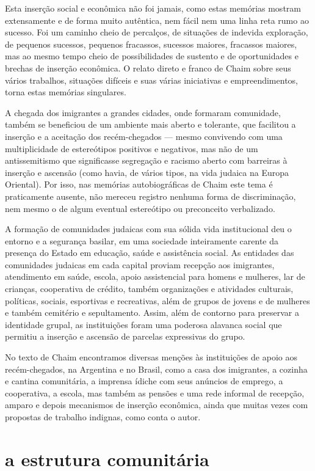 Esta inserção social e econômica não foi jamais, como estas memórias
mostram extensamente e de forma muito autêntica, nem fácil nem uma linha
reta rumo ao sucesso. Foi um caminho cheio de percalços, de situações de
indevida exploração, de pequenos sucessos, pequenos fracassos, sucessos
maiores, fracassos maiores, mas ao mesmo tempo cheio de possibilidades
de sustento e de oportunidades e brechas de inserção econômica. O relato
direto e franco de Chaim sobre seus vários trabalhos, situações difíceis
e suas várias iniciativas e empreendimentos, torna estas memórias
singulares.

A chegada dos imigrantes a grandes cidades, onde formaram comunidade,
também se beneficiou de um ambiente mais aberto e tolerante, que
facilitou a inserção e a aceitação dos recém-chegados --- mesmo
convivendo com uma multiplicidade de estereótipos positivos e negativos,
mas não de um antissemitismo que significasse segregação e racismo
aberto com barreiras à inserção e ascensão (como havia, de vários tipos,
na vida judaica na Europa Oriental). Por isso, nas memórias
autobiográficas de Chaim este tema é praticamente ausente, não mereceu
registro nenhuma forma de discriminação, nem mesmo o de algum eventual
estereótipo ou preconceito verbalizado.

A formação de comunidades judaicas com sua sólida vida institucional deu
o entorno e a segurança basilar, em uma sociedade inteiramente carente
da presença do Estado em educação, saúde e assistência social. As
entidades das comunidades judaicas em cada capital proviam recepção aos
imigrantes, atendimento em saúde, escola, apoio assistencial para homens
e mulheres, lar de crianças, cooperativa de crédito, também organizações
e atividades culturais, políticas, sociais, esportivas e recreativas,
além de grupos de jovens e de mulheres e também cemitério e
sepultamento. Assim, além de contorno para preservar a identidade
grupal, as instituições foram uma poderosa alavanca social que permitiu
a inserção e ascensão de parcelas expressivas do grupo.

No texto de Chaim encontramos diversas menções às instituições de apoio
aos recém-chegados, na Argentina e no Brasil, como a casa dos
imigrantes, a cozinha e cantina comunitária, a imprensa ídiche com seus
anúncios de emprego, a cooperativa, a escola, mas também as pensões e
uma rede informal de recepção, amparo e depois mecanismos de inserção
econômica, ainda que muitas vezes com propostas de trabalho indignas,
como conta o autor.

\section{a estrutura comunitária}

